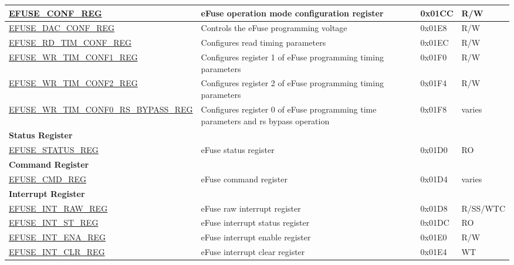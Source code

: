 \begin{longtable}{ | p{6.8cm} | p{7cm} | p{1.3cm} | p{1.2cm} | }
    \hyperref[regdesc:EFUSECONFREG]{EFUSE\_CONF\_REG} & eFuse operation mode configuration register & 0x01CC & R/W \\ \hline
    \hyperref[regdesc:EFUSEDACCONFREG]{EFUSE\_DAC\_CONF\_REG} & Controls the eFuse programming voltage & 0x01E8 & R/W \\ \hline
    \hyperref[regdesc:EFUSERDTIMCONFREG]{EFUSE\_RD\_TIM\_CONF\_REG} & Configures read timing parameters & 0x01EC & R/W \\ \hline
    \hyperref[regdesc:EFUSEWRTIMCONF1REG]{EFUSE\_WR\_TIM\_CONF1\_REG} & Configures register 1 of eFuse programming timing parameters & 0x01F0 & R/W \\ \hline
    \hyperref[regdesc:EFUSEWRTIMCONF2REG]{EFUSE\_WR\_TIM\_CONF2\_REG} & Configures register 2 of eFuse programming timing parameters & 0x01F4 & R/W \\ \hline
    \hyperref[regdesc:EFUSEWRTIMCONF0RSBYPASSREG]{EFUSE\_WR\_TIM\_CONF0\_RS\_BYPASS\_REG} & Configures register 0 of eFuse programming time parameters and rs bypass operation & 0x01F8 & varies \\ \hline
    \multicolumn{4}{|l|}{\textbf{Status Register}} \\ \hline
    \hyperref[regdesc:EFUSESTATUSREG]{EFUSE\_STATUS\_REG} & eFuse status register & 0x01D0 & RO \\ \hline
    \multicolumn{4}{|l|}{\textbf{Command Register}} \\ \hline
    \hyperref[regdesc:EFUSECMDREG]{EFUSE\_CMD\_REG} & eFuse command register & 0x01D4 & varies \\ \hline
    \multicolumn{4}{|l|}{\textbf{Interrupt Register}} \\ \hline
    \hyperref[regdesc:EFUSEINTRAWREG]{EFUSE\_INT\_RAW\_REG} & eFuse raw interrupt register & 0x01D8 & R/SS/WTC \\ \hline
    \hyperref[regdesc:EFUSEINTSTREG]{EFUSE\_INT\_ST\_REG} & eFuse interrupt status register & 0x01DC & RO \\ \hline
    \hyperref[regdesc:EFUSEINTENAREG]{EFUSE\_INT\_ENA\_REG} & eFuse interrupt enable register & 0x01E0 & R/W \\ \hline
    \hyperref[regdesc:EFUSEINTCLRREG]{EFUSE\_INT\_CLR\_REG} & eFuse interrupt clear register & 0x01E4 & WT \\ \hline
    \end{longtable}
